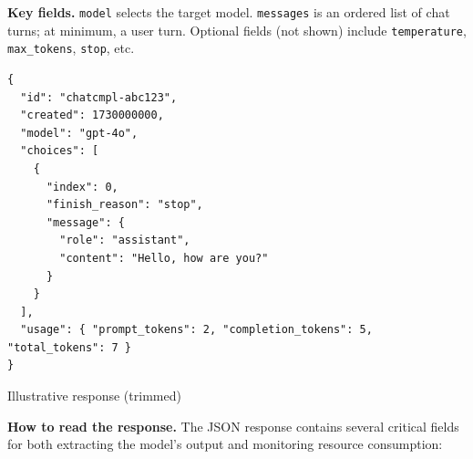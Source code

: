 \documentclass[english]{article}
\begin{document}
\noindent\textbf{Key fields.}
\texttt{model} selects the target model. \texttt{messages} is an ordered list of chat turns; at minimum, a user turn. Optional fields (not shown) include \texttt{temperature}, \texttt{max\_tokens}, \texttt{stop}, etc.

\begin{listing}[H]
\begin{verbatim}
{
  "id": "chatcmpl-abc123",
  "created": 1730000000,
  "model": "gpt-4o",
  "choices": [
    {
      "index": 0,
      "finish_reason": "stop",
      "message": {
        "role": "assistant",
        "content": "Hello, how are you?"
      }
    }
  ],
  "usage": { "prompt_tokens": 2, "completion_tokens": 5, "total_tokens": 7 }
}
\end{verbatim}
\caption{Illustrative response (trimmed)}
\end{listing}

\noindent\textbf{How to read the response.}
The JSON response contains several critical fields for both extracting the model's output and monitoring resource consumption:
\end{document}
